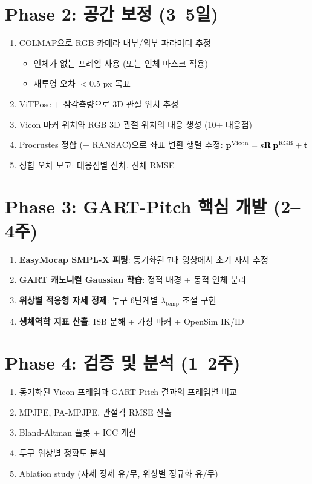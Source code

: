 \documentclass[11pt, a4paper]{report}
\begin{document}
\section{Phase 2: 공간 보정 (3--5일)}

\begin{enumerate}[leftmargin=*]
  \item COLMAP으로 RGB 카메라 내부/외부 파라미터 추정
  \begin{itemize}[nosep]
    \item 인체가 없는 프레임 사용 (또는 인체 마스크 적용)
    \item 재투영 오차 $< 0.5$ px 목표
  \end{itemize}

  \item ViTPose + 삼각측량으로 3D 관절 위치 추정

  \item Vicon 마커 위치와 RGB 3D 관절 위치의 대응 생성 (10+ 대응점)

  \item Procrustes 정합 (+ RANSAC)으로 좌표 변환 행렬 추정:
  $\mathbf{p}^{\text{Vicon}} = s\mathbf{R}\,\mathbf{p}^{\text{RGB}} + \mathbf{t}$

  \item 정합 오차 보고: 대응점별 잔차, 전체 RMSE
\end{enumerate}


\section{Phase 3: GART-Pitch 핵심 개발 (2--4주)}

\begin{enumerate}[leftmargin=*]
  \item \textbf{EasyMocap SMPL-X 피팅}: 동기화된 7대 영상에서 초기 자세 추정
  \item \textbf{GART 캐노니컬 Gaussian 학습}: 정적 배경 + 동적 인체 분리
  \item \textbf{위상별 적응형 자세 정제}: 투구 6단계별 $\lambda_{\text{temp}}$ 조절 구현
  \item \textbf{생체역학 지표 산출}: ISB 분해 + 가상 마커 + OpenSim IK/ID
\end{enumerate}


\section{Phase 4: 검증 및 분석 (1--2주)}

\begin{enumerate}[leftmargin=*]
  \item 동기화된 Vicon 프레임과 GART-Pitch 결과의 프레임별 비교
  \item MPJPE, PA-MPJPE, 관절각 RMSE 산출
  \item Bland-Altman 플롯 + ICC 계산
  \item 투구 위상별 정확도 분석
  \item Ablation study (자세 정제 유/무, 위상별 정규화 유/무)
\end{enumerate}
\end{document}
